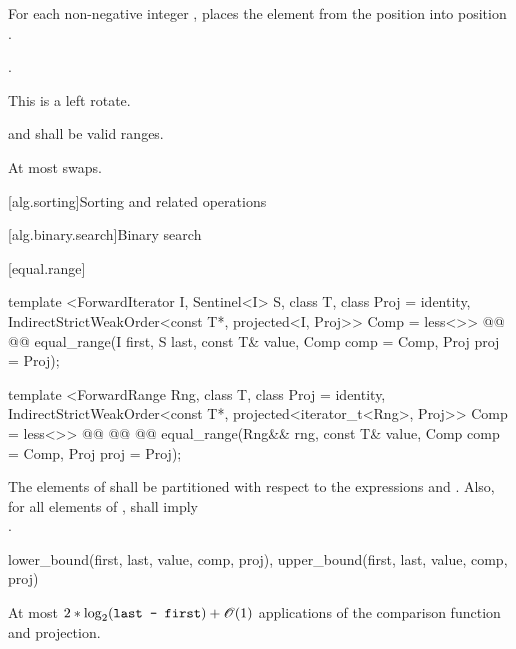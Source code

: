 \begin{itemdescr}
\pnum
\effects
For each non-negative integer
,
places the element from the position
into position
.

\pnum
\returns {}.

\pnum
\notes
This is a left rotate.

\pnum
\requires
{}
and
shall be valid ranges.

\pnum
\complexity
At most
swaps.
\end{itemdescr}

[alg.sorting]{Sorting and related operations}

\setcounter{subsection}{2}

[alg.binary.search]{Binary search}

\setcounter{subsubsection}{2}

[equal.range]{}

%
\begin{itemdecl}
template <ForwardIterator I, Sentinel<I> S, class T, class Proj = identity,
    IndirectStrictWeakOrder<const T*, projected<I, Proj>> Comp = less<>>
  @@
  @@
    equal_range(I first, S last, const T& value, Comp comp = Comp{}, Proj proj = Proj{});

template <ForwardRange Rng, class T, class Proj = identity,
    IndirectStrictWeakOrder<const T*, projected<iterator_t<Rng>, Proj>> Comp = less<>>
  @@
              @@
  @@
    equal_range(Rng&& rng, const T& value, Comp comp = Comp{}, Proj proj = Proj{});
\end{itemdecl}

\begin{itemdescr}
\pnum
\requires
The elements
of
shall be partitioned with respect to the expressions
and
.
Also, for all elements
of
\tcode{[first, last)},
shall imply \\
.

\pnum
\returns
\begin{codeblock}
{lower_bound(first, last, value, comp, proj),
 upper_bound(first, last, value, comp, proj)}
\end{codeblock}

\pnum
\complexity
At most
$2 * \log_2(\texttt{last - first}) + \mathscr{O}(1)$
applications of the comparison function and projection.
\end{itemdescr}
